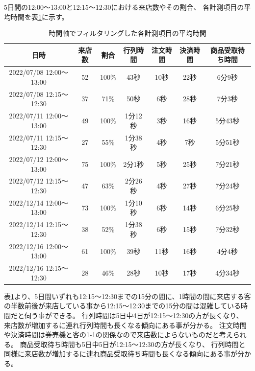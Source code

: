 \documentclass{jsarticle}
\begin{document}
\newpage
5日間の12:00〜13:00と12:15〜12:30における来店数やその割合、
各計測項目の平均時間を表\ref{table6}に示す。

\begin{table}[H]
 \begin{center}
   \caption{時間軸でフィルタリングした各計測項目の平均時間}
   \begin{tabular}{|c|c|c|c|c|c|c|} \hline
日時 & 来店数 & 割合 & 行列時間 & 注文時間 & 決済時間 & 商品受取待ち時間 \\ \hline \hline
2022/07/08 12:00〜13:00 & 52 & 100\% & 43秒    & 10秒 & 22秒 & 6分9秒 \\ \hline
2022/07/08 12:15〜12:30 & 37 & 71\%  & 50秒    & 6秒 & 28秒  & 7分3秒 \\ \hline \hline

2022/07/11 12:00〜13:00 & 49 & 100\% & 1分12秒 & 3秒 & 16秒 & 5分43秒 \\ \hline
2022/07/11 12:15〜12:30 & 27 & 55\%  & 1分38秒 & 4秒 & 7秒   & 5分51秒 \\ \hline \hline

2022/07/12 12:00〜13:00 & 75 & 100\% & 2分1秒  & 5秒  & 25秒 & 7分21秒 \\ \hline
2022/07/12 12:15〜12:30 & 47 & 63\%  & 2分26秒 & 4秒 & 27秒  & 7分24秒 \\ \hline \hline

2022/12/14 12:00〜13:00 & 73 & 100\% & 1分10秒 & 6秒 & 14秒 & 6分25秒 \\ \hline
2022/12/14 12:15〜12:30 & 38 & 52\%  & 1分38秒 & 6秒 & 15秒  & 7分32秒 \\ \hline \hline

2022/12/16 12:00〜13:00 & 61 & 100\% & 39秒 & 11秒  & 16秒 & 4分4秒 \\ \hline
2022/12/16 12:15〜12:30 & 28 & 46\%  & 28秒 & 10秒 & 17秒   & 4分34秒 \\ \hline
  \end{tabular}
 \label{table6}
 \end{center}
\end{table}


表\ref{table6}より、5日間いずれも12:15〜12:30までの15分の間に、1時間の間に来店する客の半数前後が来店している事から12:15〜12:30までの15分の間は混雑している時間だと伺う事ができる。
行列時間は5日中4日が12:15〜12:30の方が長くなり、
来店数が増加するに連れ行列時間も長くなる傾向にある事が分かる。
注文時間や決済時間は券売機と客の1-1の関係なので来店数によらないものだと考えられる。
商品受取待ち時間も5日中5日が12:15〜12:30の方が長くなり、
行列時間と同様に来店数が増加するに連れ商品受取待ち時間も長くなる傾向にある事が分かる。
\end{document}
